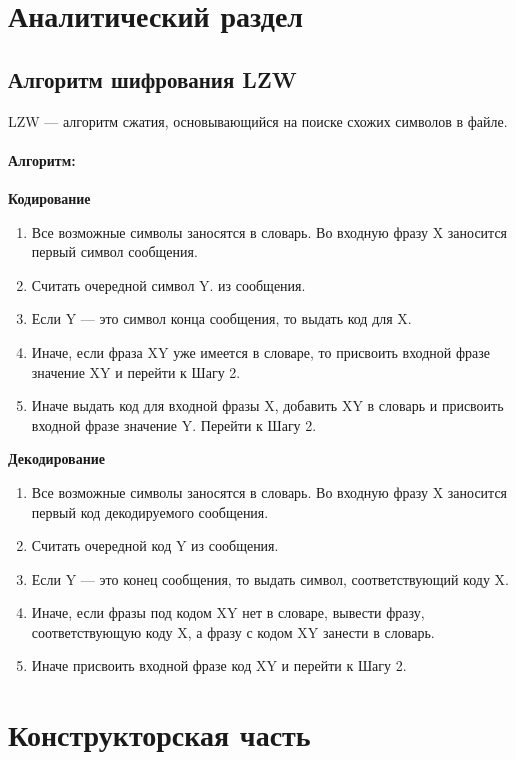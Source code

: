 \chapter{Аналитический раздел}

\section{Алгоритм шифрования LZW}

LZW --- алгоритм сжатия, основывающийся на поиске схожих символов в файле.

\subsubsection{Алгоритм:}

\textbf{Кодирование}

\begin{enumerate}
	\item Все возможные символы заносятся в словарь. Во входную фразу X
  заносится первый символ сообщения.
	\item Считать очередной символ Y.
  из сообщения.
	\item Если Y --- это символ конца сообщения, то выдать код для X.
	\item Иначе, если фраза XY уже имеется в словаре, то присвоить входной фразе значение XY и перейти к Шагу 2.
	\item Иначе выдать код для входной фразы X, добавить XY в словарь и присвоить входной фразе значение Y. Перейти к Шагу 2.
\end{enumerate}

\textbf{Декодирование}

\begin{enumerate}
  \item Все возможные символы заносятся в словарь. Во входную фразу X
  заносится первый код декодируемого сообщения.
  \item Считать очередной код Y из сообщения.
  \item Если Y --- это конец сообщения, то выдать символ, соответствующий коду X.
  \item Иначе, если фразы под кодом XY нет в словаре, вывести фразу, соответствующую коду X, а фразу с кодом XY занести в словарь.
  \item Иначе присвоить входной фразе код XY и перейти к Шагу 2.
\end{enumerate}

\clearpage

\chapter{Конструкторская часть}

